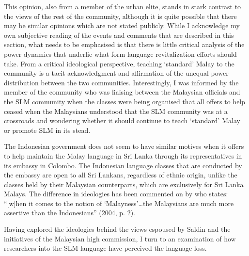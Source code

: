 This opinion, also from a member of the urban elite, stands in stark contrast to the views of the rest of the community, although it is quite possible that there may be similar opinions which are not stated publicly. While I acknowledge my own subjective reading of the events and comments that are described in this section, what needs to be emphasised is that there is little critical analysis of the power dynamics that underlie what form language revitalization efforts should take. From a critical ideological perspective, teaching `standard' Malay to the community is a tacit acknowledgment and affirmation of the unequal power distribution between the two communities. Interestingly, I was informed by the member of the community who was liaising between the Malaysian officials and the SLM community when the classes were being organised that all offers to help ceased when the Malaysians understood that the SLM community was at a crossroads and wondering whether it should continue to teach `standard' Malay or promote SLM in its stead. 

The Indonesian government does not seem to have similar motives when it offers to help maintain the Malay language in Sri Lanka through its representatives in its embassy in Colombo. The Indonesian language classes that are conducted by the embassy are open to all Sri Lankans, regardless of ethnic origin, unlike the classes held by their Malaysian counterparts, which are exclusively for Sri Lanka Malays. The difference in ideologies has been commented on by \citet{Tirtosudarmo2004} who states: ``[w]hen it comes to the notion of `Malayness'{\dots}the Malaysians are much more assertive than the Indonesians'' (2004, p. 2). 

Having explored the ideologies behind the views espoused by Saldin and the initiatives of the Malaysian high commission, I turn to an examination of how researchers into the SLM language have perceived the language loss. 

